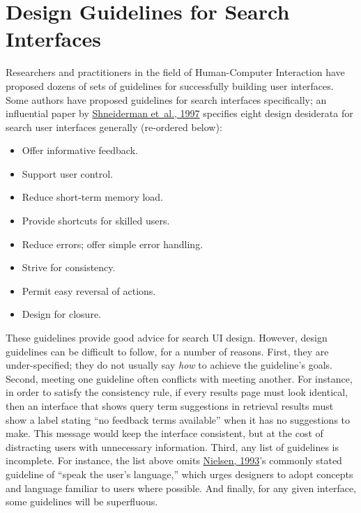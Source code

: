 \documentclass[sigconf,nonacm,screen,pbalance]{acmart}
\begin{document}
\section{Design Guidelines for Search Interfaces}

Researchers and practitioners in the field of Human-Computer Interaction have proposed dozens of sets of
guidelines for successfully building user interfaces. Some authors have proposed guidelines for search
interfaces specifically; an influential paper by \href{https://searchuserinterfaces.com/book/sui_references.html#shneiderman1997csu}{Shneiderman et~al., 1997} specifies eight design desiderata for
search user interfaces generally (re-ordered below):

\begin{itemize}
\item Offer informative feedback. 
\item Support user control. 
\item Reduce short-term memory load. 
\item Provide shortcuts for skilled users. 
\item Reduce errors; offer simple error handling. 
\item Strive for consistency. 
\item Permit easy reversal of actions. 
\item Design for closure. 
\end{itemize}

These guidelines provide good advice for search UI design. However, design guidelines can be difficult to
follow, for a number of reasons. First, they are under-specified; they do not usually say {\em  how} to
achieve the guideline's goals. Second, meeting one guideline often conflicts with meeting another. For
instance, in order to satisfy the consistency rule, if every results page must look identical, then an
interface that shows query term suggestions in retrieval results must show a label stating ``no feedback
terms available'' when it has no suggestions to make. This message would keep the interface consistent, but
at the cost of distracting users with unnecessary information. Third, any list of guidelines is
incomplete. For instance, the list above omits \href{https://searchuserinterfaces.com/book/sui_references.html#nielsen93}{Nielsen, 1993}'s commonly stated guideline of ``speak the user's language,'' which urges
designers to adopt concepts and language familiar to users where possible. And finally, for any given
interface, some guidelines will be superfluous.
\end{document}
